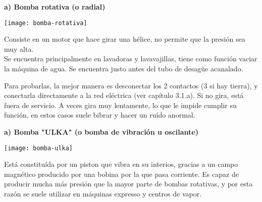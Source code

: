 \begin{large}
\textbf{a) Bomba rotativa (o radial)}
\end{large}

\noindent\begin{minipage}[t]{0.3\textwidth}\vspace{0pt}
\texttt{[image: bomba-rotativa]}
\end{minipage}
\hfill%
\begin{minipage}[t]{0.6\textwidth}\vspace{\fill}
\vspace{\fill}
\begin{flushleft}
Consiste en un motor que hace girar una hélice, no permite que la presión sea muy alta.\\


Se encuentra principalmente en lavadoras y lavavajillas, tiene como función vaciar la máquina de agua. Se encuentra justo antes del tubo de desagüe acanalado.
\end{flushleft}
\vspace{\fill}
\end{minipage}
\vspace{1em}

Para probarlas, la mejor manera es desconectar los 2 contactos (3 si hay tierra), y conectarla directamente a la red eléctrica (ver capítulo 3.1.a). Si no gira, está fuera de servicio. A veces gira muy lentamente, lo que le impide cumplir su función, en estos casos suele bibrar y hacer un ruído anormal.\\


\begin{large}
\textbf{a) Bomba "ULKA" (o bomba de vibración u oscilante)}
\end{large}

\noindent\begin{minipage}[t]{0.5\textwidth}\vspace{0pt}
\texttt{[image: bomba-ulka]}
\end{minipage}
\hfill%
\begin{minipage}[t]{0.5\textwidth}\vspace{\fill}
\vspace{\fill}
\begin{flushleft}
Está constituída por un piston que vibra en su interios, gracias a un campo magnético producido por una bobina por la que pasa corriente. Es capaz de producir mucha más presión que la mayor parte de bombas rotativas, y por esta razón se suele utilizar en máquinas expresso y centros de vapor.
\end{flushleft}
\vspace{\fill}
\end{minipage}
\vspace{1em}

